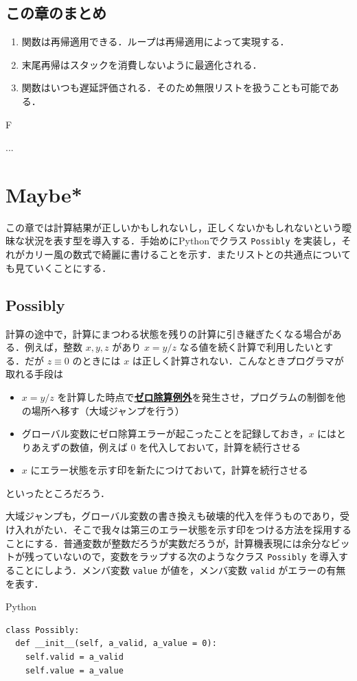 \documentclass[a4paper,twocolumn]{jsbook}
\newcommand{\programminglanguage}[1]{\textsf{#1}}
\newcommand{\python}{\programminglanguage{Python}}
\newenvironment{leader}{\begingroup\gt}{\endgroup}
\newenvironment{note}[1]{\begin{boxnote}\begin{center}#1\end{center}}{\end{boxnote}}
\newcommand{\keyword}[1]{{\underline{\textbf{#1}}}}
\newcommand{\code}[1]{\texttt{#1}}
\newenvironment{pythoncode}{\begin{itembox}[r]{\python}}{\end{itembox}}
\begin{document}
\section{この章のまとめ}

\begin{enumerate}
\item 関数は再帰適用できる．ループは再帰適用によって実現する．
\item 末尾再帰はスタックを消費しないように最適化される．
\item 関数はいつも遅延評価される．そのため無限リストを扱うことも可能である．
\end{enumerate}

\begin{note}{F}
...
\end{note}


\chapter{Maybe*}

\begin{leader}
この章では計算結果が正しいかもしれないし，正しくないかもしれないという曖昧な状況を表す型を導入する．手始めに\python でクラス \code{Possibly} を実装し，それがカリー風の数式で綺麗に書けることを示す．またリストとの共通点についても見ていくことにする．
\end{leader}

\section{Possibly}

計算の途中で，計算にまつわる状態を残りの計算に引き継ぎたくなる場合がある．例えば，整数 $x,y,z$ があり $x=y/z$ なる値を続く計算で利用したいとする．だが $z\equiv0$ のときには $x$ は正しく計算されない．こんなときプログラマが取れる手段は
\begin{itemize}
\item $x=y/z$ を計算した時点で\keyword{ゼロ除算例外}を発生させ，プログラムの制御を他の場所へ移す（大域ジャンプを行う）
\item グローバル変数にゼロ除算エラーが起こったことを記録しておき，$x$ にはとりあえずの数値，例えば $0$ を代入しておいて，計算を続行させる
\item $x$ にエラー状態を示す印を新たにつけておいて，計算を続行させる
\end{itemize}
といったところだろう．

大域ジャンプも，グローバル変数の書き換えも破壊的代入を伴うものであり，受け入れがたい．そこで我々は第三のエラー状態を示す印をつける方法を採用することにする．普通変数が整数だろうが実数だろうが，計算機表現には余分なビットが残っていないので，変数をラップする次のようなクラス \code{Possibly} を導入することにしよう．メンバ変数 \code{value} が値を，メンバ変数 \code{valid} がエラーの有無を表す．
\begin{pythoncode}
\begin{verbatim}
class Possibly:
  def __init__(self, a_valid, a_value = 0):
    self.valid = a_valid
    self.value = a_value
\end{verbatim}
\end{pythoncode}
\end{document}
